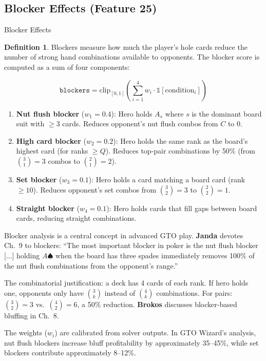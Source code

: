 \documentclass[11pt, a4paper]{article}
\theoremstyle{definition}
\newtheorem{definition}{Definition}[section]
\newcommand{\feature}[1]{\texttt{#1}}
\newcommand{\clip}[1]{\text{clip}_{[0,1]}\!\left(#1\right)}
\begin{document}
\subsection{Blocker Effects (Feature 25)}

\begin{featurebox}{Blocker Effects}
\begin{definition}
Blockers measure how much the player's hole cards reduce the number of strong hand combinations available to opponents. The blocker score is computed as a sum of four components:

\begin{equation}
    \feature{blockers} = \clip{\sum_{i=1}^{4} w_i \cdot \mathbb{1}[\text{condition}_i]}
\end{equation}

\begin{enumerate}
    \item \textbf{Nut flush blocker} ($w_1 = 0.4$): Hero holds $A_s$ where $s$ is the dominant board suit with $\geq 3$ cards. Reduces opponent's nut flush combos from $C$ to $0$.
    
    \item \textbf{High card blocker} ($w_2 = 0.2$): Hero holds the same rank as the board's highest card (for ranks $\geq Q$). Reduces top-pair combinations by 50\% (from $\binom{3}{1} = 3$ combos to $\binom{2}{1} = 2$).
    
    \item \textbf{Set blocker} ($w_3 = 0.1$): Hero holds a card matching a board card (rank $\geq 10$). Reduces opponent's set combos from $\binom{3}{2} = 3$ to $\binom{2}{2} = 1$.
    
    \item \textbf{Straight blocker} ($w_4 = 0.1$): Hero holds cards that fill gaps between board cards, reducing straight combinations.
\end{enumerate}
\end{definition}
\end{featurebox}

\begin{refbox}
Blocker analysis is a central concept in advanced GTO play. \textbf{Janda} \cite{janda2017} devotes Ch.~9 to blockers: ``The most important blocker in poker is the nut flush blocker [...] holding $A\spadesuit$ when the board has three spades immediately removes 100\% of the nut flush combinations from the opponent's range.''

The combinatorial justification: a deck has 4 cards of each rank. If hero holds one, opponents only have $\binom{3}{k}$ instead of $\binom{4}{k}$ combinations. For pairs: $\binom{3}{2} = 3$ vs.\ $\binom{4}{2} = 6$, a 50\% reduction. \textbf{Brokos} \cite{brokos2014} discusses blocker-based bluffing in Ch.~8.

The weights ($w_i$) are calibrated from solver outputs. In GTO Wizard's analysis, nut flush blockers increase bluff profitability by approximately 35--45\%, while set blockers contribute approximately 8--12\%.
\end{refbox}
\end{document}
